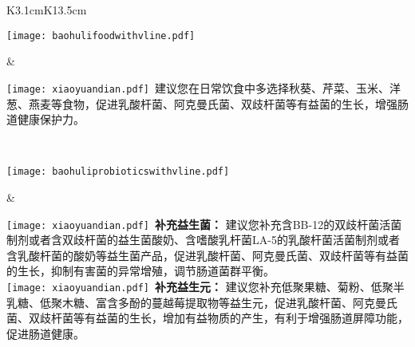 \setlength{\arrayrulewidth}{.5pt}
\vspace*{-2mm}
\begin{center}
\begin{tabular}{K{3.1cm}K{13.5cm}}
\hline

\parbox[c][3cm]{.95\hsize}{
\noindent
\texttt{[image: baohulifoodwithvline.pdf]}
}
 &
\parbox{\hsize}{
\vspace*{0.5mm}
\begin{spacing}{1.5}
\fontsize{10pt}{10pt}
{\texttt{[image: xiaoyuandian.pdf]}\fontsize{9pt}{10pt}\selectfont \ 建议您在日常饮食中多选择秋葵、芹菜、玉米、洋葱、燕麦等食物，促进乳酸杆菌、阿克曼氏菌、双歧杆菌等有益菌的生长，增强肠道健康保护力。}
\end{spacing}
} \\
\hline

\parbox[c][4.5cm]{.95\hsize}{
\noindent
\texttt{[image: baohuliprobioticswithvline.pdf]}
}
 &
\parbox{\hsize}{
\vspace*{0.5mm}
\begin{spacing}{1.5}
\fontsize{10pt}{10pt}
{\texttt{[image: xiaoyuandian.pdf]}\fontsize{9pt}{10pt}\selectfont \ {\bf {补充益生菌：}} 建议您补充含BB-12的双歧杆菌活菌制剂或者含双歧杆菌的益生菌酸奶、含嗜酸乳杆菌LA-5的乳酸杆菌活菌制剂或者含乳酸杆菌的酸奶等益生菌产品，促进乳酸杆菌、阿克曼氏菌、双歧杆菌等有益菌的生长，抑制有害菌的异常增殖，调节肠道菌群平衡。 \\}
{\texttt{[image: xiaoyuandian.pdf]}\fontsize{9pt}{10pt}\selectfont \ {\bf {补充益生元：}} 建议您补充低聚果糖、菊粉、低聚半乳糖、低聚木糖、富含多酚的蔓越莓提取物等益生元，促进乳酸杆菌、阿克曼氏菌、双歧杆菌等有益菌的生长，增加有益物质的产生，有利于增强肠道屏障功能，促进肠道健康。}
\end{spacing}
} \\
\hline

\end{tabular}
\end{center}




